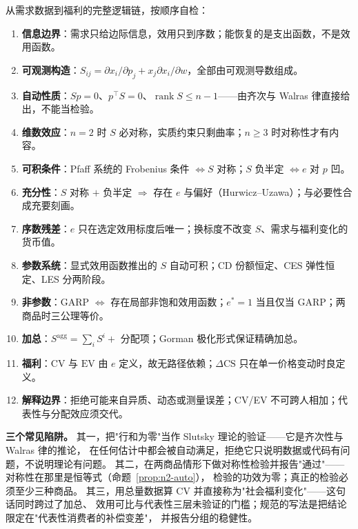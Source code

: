 \noindent 从需求数据到福利的完整逻辑链，按顺序自检：

\begin{enumerate}
\item \textbf{信息边界}：需求只给边际信息，效用只到序数；能恢复的是支出函数，不是效用函数。
\item \textbf{可观测构造}：$S_{ij}=\partial x_i/\partial p_j+x_j\partial x_i/\partial w$，全部由可观测导数组成。
\item \textbf{自动性质}：$Sp=0$、$p^{\top}S=0$、$\operatorname{rank}S\le n-1$——由齐次与 Walras 律直接给出，不能当检验。
\item \textbf{维数效应}：$n=2$ 时 $S$ 必对称，实质约束只剩曲率；$n\ge3$ 时对称性才有内容。
\item \textbf{可积条件}：Pfaff 系统的 Frobenius 条件 $\iff S$ 对称；$S$ 负半定 $\iff e$ 对 $p$ 凹。
\item \textbf{充分性}：$S$ 对称 $+$ 负半定 $\Rightarrow$ 存在 $e$ 与偏好（Hurwicz--Uzawa）；与必要性合成充要刻画。
\item \textbf{序数残差}：$e$ 只在选定效用标度后唯一；换标度不改变 $S$、需求与福利变化的货币值。
\item \textbf{参数系统}：显式效用函数推出的 $S$ 自动可积；CD 份额恒定、CES 弹性恒定、LES 分两阶段。
\item \textbf{非参数}：GARP $\iff$ 存在局部非饱和效用函数；$e^*=1$ 当且仅当 GARP；两商品时三公理等价。
\item \textbf{加总}：$S^{\mathrm{agg}}=\sum_iS^i+$ 分配项；Gorman 极化形式保证精确加总。
\item \textbf{福利}：$\mathrm{CV}$ 与 $\mathrm{EV}$ 由 $e$ 定义，故无路径依赖；$\Delta\mathrm{CS}$ 只在单一价格变动时良定义。
\item \textbf{解释边界}：拒绝可能来自异质、动态或测量误差；CV/EV 不可跨人相加；代表性与分配效应须交代。
\end{enumerate}

\medskip
\noindent\textbf{三个常见陷阱。}
其一，把"行和为零"当作 Slutsky 理论的验证——它是齐次性与 Walras 律的推论，
在任何估计中都会被自动满足，拒绝它只说明数据或代码有问题，不说明理论有问题。
其二，在两商品情形下做对称性检验并报告"通过"——对称性在那里是恒等式（命题~\ref{prop:n2-auto}），
检验的功效为零；真正的检验必须至少三种商品。
其三，用总量数据算 CV 并直接称为"社会福利变化"——这句话同时跨过了加总、
效用可比与代表性三层未验证的门槛；规范的写法是把结论限定在"代表性消费者的补偿变差"，
并报告分组的稳健性。

